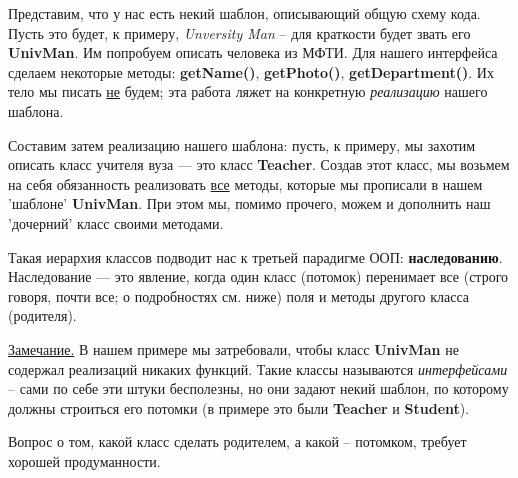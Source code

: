 \renewcommand{\mainFolder}{/home/aleksei/github_projects/latex_works/informatics}
\renewcommand{\myFolder}{\mainFolder/lecture_\arabic{lectureNo}/}

\renewcommand{\lectureSubject}{Наследование}
%



\begin{lecture}[\lectureSubject]
	\begin{lecSection}
		Представим, что у нас есть некий шаблон, описывающий общую схему кода. Пусть это будет, к примеру, \textit{Unversity Man} -- для краткости будет звать его \textbf{UnivMan}. Им попробуем описать человека из МФТИ. Для нашего интерфейса сделаем некоторые методы: \textbf{getName()}, \textbf{getPhoto()}, \textbf{getDepartment()}. Их тело мы писать \underline{не} будем; эта работа ляжет на конкретную \textit{реализацию} нашего шаблона.
		
		Составим затем реализацию нашего шаблона: пусть, к примеру, мы захотим описать класс учителя вуза --- это класс \textbf{Teacher}. Создав этот класс, мы возьмем на себя обязанность реализовать \underline{все} методы, которые мы прописали в нашем 'шаблоне' \textbf{UnivMan}. При этом мы, помимо прочего, можем и дополнить наш 'дочерний' класс своими методами.
		
	\end{lecSection}
	\begin{lecSection}
		Такая иерархия классов подводит нас к третьей парадигме ООП: \textbf{наследованию}. Наследование --- это явление, когда один класс (потомок) перенимает все (строго говоря, почти все; о подробностях см. ниже) поля и методы другого класса (родителя).
		
		\underline{Замечание.} В нашем примере мы затребовали, чтобы класс \textbf{UnivMan} не содержал реализаций никаких функций. Такие классы называются \textit{интерфейсами} -- сами по себе эти штуки бесполезны, но они задают некий шаблон, по которому должны строиться его потомки (в примере это были \textbf{Teacher} и \textbf{Student}).
	\end{lecSection}
	\begin{lecSection}
		Вопрос о том, какой класс сделать родителем, а какой -- потомком, требует хорошей продуманности.
		

\end{lecSection}
\end{lecture}
